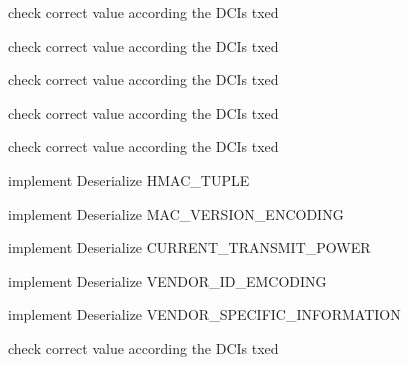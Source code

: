 \begin{DoxyRefList}
check correct value according the D\+C\+Is txed  
\item[\label{todo__todo000110}%
\hypertarget{todo__todo000110}{}%
Member \hyperlink{classns3_1_1TdMtFfMacScheduler_a8e843571dc5fdfe5503df5a468af277c}{ns3\+:\+:Td\+Mt\+Ff\+Mac\+Scheduler\+:\+:Do\+Sched\+Dl\+Trigger\+Req} (const struct \hyperlink{structns3_1_1FfMacSchedSapProvider_1_1SchedDlTriggerReqParameters}{Ff\+Mac\+Sched\+Sap\+Provider\+::\+Sched\+Dl\+Trigger\+Req\+Parameters} \&params)]check correct value according the D\+C\+Is txed 

check correct value according the D\+C\+Is txed  
\item[\label{todo__todo000111}%
\hypertarget{todo__todo000111}{}%
Member \hyperlink{classns3_1_1TdTbfqFfMacScheduler_ad8195ea29a3aec05aa9766537e31cdf7}{ns3\+:\+:Td\+Tbfq\+Ff\+Mac\+Scheduler\+:\+:Do\+Sched\+Dl\+Trigger\+Req} (const struct \hyperlink{structns3_1_1FfMacSchedSapProvider_1_1SchedDlTriggerReqParameters}{Ff\+Mac\+Sched\+Sap\+Provider\+::\+Sched\+Dl\+Trigger\+Req\+Parameters} \&params)]check correct value according the D\+C\+Is txed 

check correct value according the D\+C\+Is txed  
\item[\label{todo__todo000185}%
\hypertarget{todo__todo000185}{}%
Member \hyperlink{classns3_1_1Tlv_ab7f78a79bda165414feb774daf217fc2}{ns3\+:\+:Tlv\+:\+:Deserialize} (\hyperlink{classns3_1_1Buffer_1_1Iterator}{Buffer\+::\+Iterator} start)]implement Deserialize H\+M\+A\+C\+\_\+\+T\+U\+P\+LE 

implement Deserialize M\+A\+C\+\_\+\+V\+E\+R\+S\+I\+O\+N\+\_\+\+E\+N\+C\+O\+D\+I\+NG 

implement Deserialize C\+U\+R\+R\+E\+N\+T\+\_\+\+T\+R\+A\+N\+S\+M\+I\+T\+\_\+\+P\+O\+W\+ER 

implement Deserialize V\+E\+N\+D\+O\+R\+\_\+\+I\+D\+\_\+\+E\+M\+C\+O\+D\+I\+NG 

implement Deserialize V\+E\+N\+D\+O\+R\+\_\+\+S\+P\+E\+C\+I\+F\+I\+C\+\_\+\+I\+N\+F\+O\+R\+M\+A\+T\+I\+ON  
\item[\label{todo__todo000112}%
\hypertarget{todo__todo000112}{}%
Member \hyperlink{classns3_1_1TtaFfMacScheduler_adc734578d3c46a0d8a9eb2cdcafb6d61}{ns3\+:\+:Tta\+Ff\+Mac\+Scheduler\+:\+:Do\+Sched\+Dl\+Trigger\+Req} (const struct \hyperlink{structns3_1_1FfMacSchedSapProvider_1_1SchedDlTriggerReqParameters}{Ff\+Mac\+Sched\+Sap\+Provider\+::\+Sched\+Dl\+Trigger\+Req\+Parameters} \&params)]check correct value according the D\+C\+Is txed 


\end{DoxyRefList}
